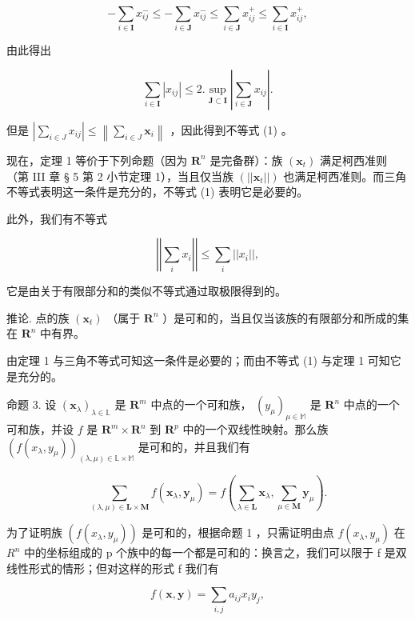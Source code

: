 \[
- \sum_ {i \in \mathbf {I}} x _ {i j} ^ {-} \leqslant - \sum_ {i \in \mathbf {J}} x _ {i j} ^ {-} \leqslant \sum_ {i \in \mathbf {J}} x _ {i j} ^ {+} \leqslant \sum_ {i \in \mathbf {I}} x _ {i j} ^ {+},
\]

由此得出

\[
\sum_ {i \in \mathbf {I}} | x _ {i j} | \leqslant 2. \sup _ {\mathbf {J} \subset \mathbf {I}} \left| \sum_ {i \in \mathbf {J}} x _ {i j} \right|.
\]

但是 \(\left|\sum_{i\in J}x_{ij}\right| \leqslant \left\| \sum_{i\in J}\boldsymbol{x}_i\right\|\) ，因此得到不等式 (1) 。

现在，定理 1 等价于下列命题（因为 \(\mathbf{R}^n\) 是完备群）：族 \((\pmb{x}_t)\) 满足柯西准则（第 III 章 § 5 第 2 小节定理 1），当且仅当族 \((||\pmb{x}_t||)\) 也满足柯西准则。而三角不等式表明这一条件是充分的，不等式 (1) 表明它是必要的。

此外，我们有不等式

\[
\left| \left| \sum_ {i} x _ {i} \right| \right| \leqslant \sum_ {i} | | x _ {i} | |,\tag{2}
\]

它是由关于有限部分和的类似不等式通过取极限得到的。

推论. 点的族 \((\pmb{x}_t)\) （属于 \(\mathbf{R}^n\) ）是可和的，当且仅当该族的有限部分和所成的集在 \(\mathbf{R}^n\) 中有界。

由定理 1 与三角不等式可知这一条件是必要的；而由不等式 (1) 与定理 1 可知它是充分的。

命题 3. 设 \((\pmb{x}_{\lambda})_{\lambda \in \mathbb{L}}\) 是 \(\mathbf{R}^m\) 中点的一个可和族， \((y_{\mu})_{\mu \in \mathbb{M}}\) 是 \(\mathbf{R}^n\) 中点的一个可和族，并设 \(f\) 是 \(\mathbf{R}^m \times \mathbf{R}^n\) 到 \(\mathbf{R}^p\) 中的一个双线性映射。那么族 \((f(x_{\lambda}, y_{\mu}))_{(\lambda, \mu) \in \mathbb{L} \times \mathbb{M}}\) 是可和的，并且我们有

\[
\sum_ {(\lambda , \mu) \in \mathbf {L} \times \mathbf {M}} f \left(\boldsymbol {x} _ {\lambda}, \boldsymbol {y} _ {\mu}\right) = f \left(\sum_ {\lambda \in \mathbf {L}} \boldsymbol {x} _ {\lambda}, \sum_ {\mu \in \mathbf {M}} \boldsymbol {y} _ {\mu}\right).\tag{3}
\]

为了证明族 \((f(x_{\lambda}, y_{\mu}))\) 是可和的，根据命题 1 ，只需证明由点 \(f(x_{\lambda}, y_{\mu})\) 在 \(R^{n}\) 中的坐标组成的 p 个族中的每一个都是可和的：换言之，我们可以限于 f 是双线性形式的情形；但对这样的形式 f 我们有

\[
f (\boldsymbol {x}, \boldsymbol {y}) = \sum_ {i, j} a _ {i j} x _ {i} y _ {j},
\]

